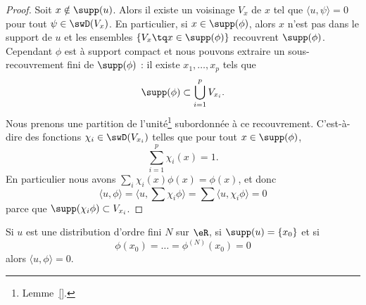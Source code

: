 \begin{proof}
    Soit \( x\notin\supp(u)\). Alors il existe un voisinage \( V_x\) de \( x\) tel que \( \langle u, \psi\rangle =0\) pour tout \( \psi\in\swD(V_x)\). En particulier, si \( x\in\supp(\phi)\), alors \( x\) n'est pas dans le support de \( u\) et les ensembles \( \{ V_x\tq x\in\supp(\phi) \}\) recouvrent \( \supp(\phi)\). Cependant \( \phi\) est à support compact et nous pouvons extraire un sous-recouvrement fini de \( \supp(\phi)\) : il existe \( x_1,\ldots, x_p\) tels que
    \begin{equation}
        \supp(\phi)\subset\bigcup_{i=1}^pV_{x_i}.
    \end{equation}
    Nous prenons une partition de l'unité\footnote{Lemme~\ref{}.} subordonnée à ce recouvrement. C'est-à-dire des fonctions \( \chi_i\in\swD(V_{x_i})\) telles que pour tout \( x\in\supp(\phi)\),
    \begin{equation}
        \sum_{i=1}^p\chi_i(x)=1.
    \end{equation}
    En particulier nous avons \( \sum_i\chi_i(x)\phi(x)=\phi(x)\), et donc
    \begin{equation}
        \langle u, \phi\rangle =\langle u, \sum \chi_i\phi\rangle =\sum\langle u, \chi_i\phi\rangle =0
    \end{equation}
    parce que \( \supp(\chi_i\phi)\subset V_{x_i}\).
\end{proof}

\begin{lemma}
    Si \( u\) est une distribution d'ordre fini \( N\) sur \( \eR\), si \( \supp(u)=\{ x_0 \}\) et si
    \begin{equation}
        \phi(x_0)=\ldots=\phi^{(N)}(x_0)=0
    \end{equation}
    alors \( \langle u, \phi\rangle =0\).
\end{lemma}

